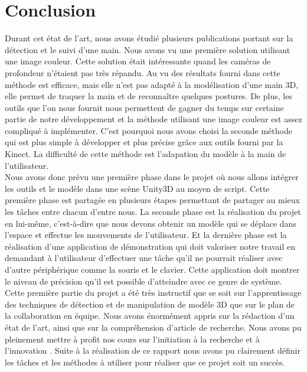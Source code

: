 \chapter*{Conclusion}
Durant cet état de l'art, nous avons étudié plusieurs publications portant sur la détection et le suivi
d'une main. Nous avons vu une première solution utilisant une image couleur. Cette solution était
intéressante quand les caméras de profondeur n'étaient pas très répandu. Au vu des résultats fourni dans
\cite{haarlike} cette méthode est efficace, mais elle n'est pas adapté à la modélisation d'une main 3D, elle permet
de traquer la main et de reconnaître quelques postures. De plus, les outils que l'on nous fournit nous permettent
de gagner du temps sur certaine partie de notre développement et la méthode utilisant une image couleur
est assez compliqué à implémenter. C'est pourquoi nous avons choisi la seconde méthode qui est plus
simple à développer et plus précise grâce aux outils fourni par la Kinect. La difficulté de cette méthode
est l'adapation du modèle à la main de l'utilisateur.\\

Nous avons donc prévu une première phase dans le projet où nous allons intégrer les outils et le modèle
dans une scène Unity3D au moyen de script. Cette première phase est partagée en plusieurs étapes permettant
de partager au mieux les tâches entre chacun d'entre nous. La seconde phase est la réalisation du projet en lui-même, c'est-à-dire 
que nous devons obtenir un modèle qui se déplace dans l'espace et effectue les mouvements de l'utilisateur.
Et la dernière phase est la réalisation d'une application de démonstration qui doit valoriser notre travail
en demandant à l'utilisateur d'effectuer une tâche qu'il ne pourrait réaliser avec d'autre périphérique comme
la souris et le clavier. Cette application doit montrer le niveau de précision qu'il est possible d'atteindre
avec ce genre de système.\\

Cette première partie du projet a été très instructif que se soit sur l'apprentissage des techniques de détection et de manipulation
de modèle 3D que sur le plan de la collaboration en équipe. Nous avons énormément appris sur la rédaction d'un
état de l'art, ainsi que sur la compréhension d'article de recherche. Nous avons pu pleinement mettre à profit
nos cours sur \og l'initiation à la recherche et à l'innovation \fg. Suite à la réalisation de ce rapport nous avons pu
clairement définir les tâches et les méthodes à utiliser pour réaliser que ce projet soit un succès. 
